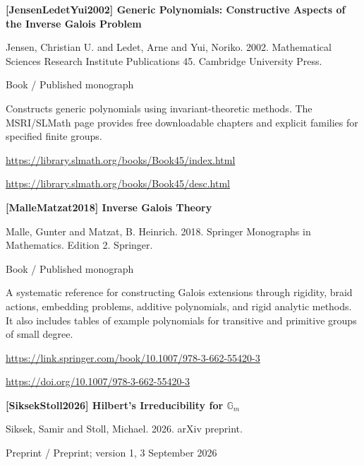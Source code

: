 \documentclass[11pt,a4paper,oneside,openany]{book}
\begin{document}
\vspace{9pt}
\hypertarget{ref:JensenLedetYui2002}{}
{\sffamily\bfseries\color{atlasgreen}[JensenLedetYui2002] Generic Polynomials: Constructive Aspects of the Inverse Galois Problem}\par
\color{black} Jensen, Christian U. and Ledet, Arne and Yui, Noriko. 2002. Mathematical Sciences Research Institute Publications 45. Cambridge University Press.\par
{\small\sffamily\color{atlasgold}Book / Published monograph}\par
\color{black} Constructs generic polynomials using invariant-theoretic methods. The MSRI/SLMath page provides free downloadable chapters and explicit families for specified finite groups.\par
{\footnotesize\url{https://library.slmath.org/books/Book45/index.html}}\par
{\footnotesize\url{https://library.slmath.org/books/Book45/desc.html}}\par
\vspace{9pt}
\hypertarget{ref:MalleMatzat2018}{}
{\sffamily\bfseries\color{atlasgreen}[MalleMatzat2018] Inverse Galois Theory}\par
\color{black} Malle, Gunter and Matzat, B. Heinrich. 2018. Springer Monographs in Mathematics. Edition 2. Springer.\par
{\small\sffamily\color{atlasgold}Book / Published monograph}\par
\color{black} A systematic reference for constructing Galois extensions through rigidity, braid actions, embedding problems, additive polynomials, and rigid analytic methods. It also includes tables of example polynomials for transitive and primitive groups of small degree.\par
{\footnotesize\url{https://link.springer.com/book/10.1007/978-3-662-55420-3}}\par
{\footnotesize\url{https://doi.org/10.1007/978-3-662-55420-3}}\par
\vspace{9pt}
\hypertarget{ref:SiksekStoll2026}{}
{\sffamily\bfseries\color{atlasgreen}[SiksekStoll2026] Hilbert's Irreducibility for \(\mathbb{G}_m\)}\par
\color{black} Siksek, Samir and Stoll, Michael. 2026. arXiv preprint.\par
{\small\sffamily\color{atlasgold}Preprint / Preprint; version 1, 3 September 2026}\par
\end{document}
